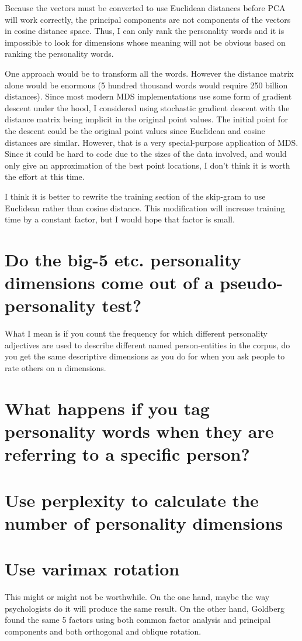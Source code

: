 \documentclass[eric_thesis.tex]{subfiles}
\begin{document}
Because the vectors must be converted to use Euclidean distances before PCA will work correctly, the principal components are not components of the vectors in cosine distance space. Thus, I can only rank the personality words and it is impossible to look for dimensions whose meaning will not be obvious based on ranking the personality words.

One approach would be to transform all the words. However the distance matrix alone would be enormous (5 hundred thousand words would require 250 billion distances). Since most modern MDS implementations use some form of gradient descent under the hood, I considered using stochastic gradient descent with the distance matrix being implicit in the original point values. The initial point for the descent could be the original point values since Euclidean and cosine distances are similar. However, that is a very special-purpose application of MDS. Since it could be hard to code due to the sizes of the data involved, and would only give an approximation of the best point locations, I don't think it is worth the effort at this time.

I think it is better to rewrite the training section of the skip-gram to use Euclidean rather than cosine distance. This modification will increase training time by a constant factor, but I would hope that factor is small.

\section{Do the big-5 etc. personality dimensions come out of a pseudo-personality test?}
What I mean is if you count the frequency for which different personality adjectives are used to describe different named person-entities in the corpus, do you get the same descriptive dimensions as you do for when you ask people to rate others on n dimensions.

\section{What happens if you tag personality words when they are referring to a specific person?}

\section{Use perplexity to calculate the number of personality dimensions}

\section{Use varimax rotation}


This might or might not be worthwhile. On the one hand, maybe the way
psychologists do it will produce the same result. On the other hand,
Goldberg  found the same 5 factors using both common factor
analysis and principal components and both orthogonal and oblique
rotation.
\end{document}
